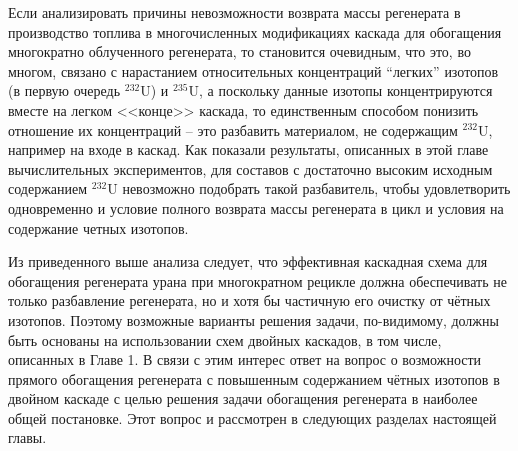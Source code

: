 Если анализировать причины невозможности возврата массы регенерата в производство топлива в многочисленных модификациях каскада для обогащения многократно облученного регенерата, то становится очевидным, что это, во многом, связано с нарастанием относительных концентраций “легких” изотопов (в первую очередь $^{232}$U) и
$^{235}$U, а поскольку данные изотопы концентрируются вместе на легком <<конце>> каскада, то единственным способом понизить отношение их концентраций -- это разбавить материалом, не содержащим $^{232}$U, например на входе в каскад. Как показали результаты, описанных в этой главе вычислительных экспериментов, для составов с достаточно высоким исходным содержанием $^{232}$U невозможно подобрать такой разбавитель, чтобы удовлетворить одновременно и условие полного возврата массы регенерата в цикл и условия на содержание четных изотопов.

Из приведенного выше анализа следует, что эффективная каскадная схема для обогащения регенерата урана при многократном рецикле должна обеспечивать не только разбавление регенерата, но и хотя бы частичную его очистку от чётных изотопов. Поэтому возможные варианты решения задачи, по-видимому, должны быть основаны на использовании схем двойных каскадов, в том числе, описанных в Главе 1. В связи с этим интерес ответ на вопрос о возможности прямого обогащения регенерата с повышенным содержанием чётных изотопов в двойном каскаде с целью решения задачи обогащения регенерата в наиболее общей постановке. Этот вопрос и рассмотрен в следующих разделах настоящей главы.

\clearpage
